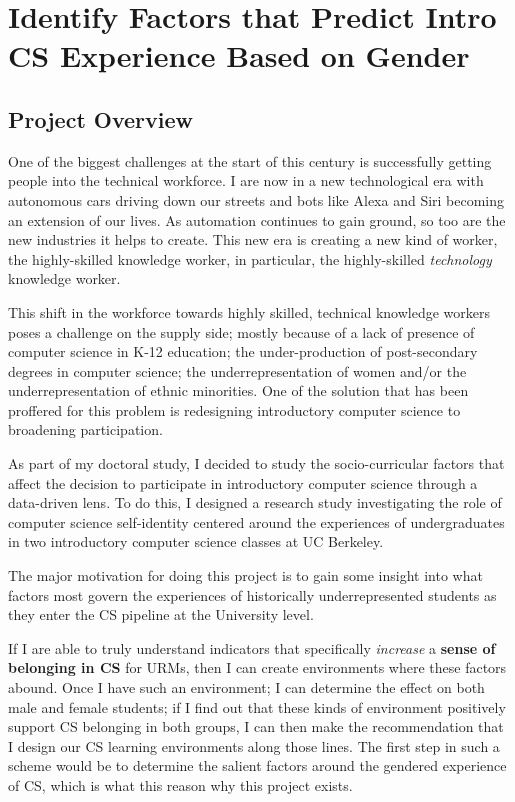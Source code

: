 
\chapter*{Identify Factors that Predict Intro CS Experience Based on Gender}

\section*{Project Overview}

One of the biggest challenges at the start of this century is successfully getting people into the technical workforce. I are now in a new technological era with autonomous cars driving down our streets and bots like Alexa and Siri becoming an extension of our lives. As automation continues to gain ground, so too are the new industries it helps to create. This new era is creating a new kind of worker, the highly-skilled knowledge worker, in particular, the highly-skilled \emph{technology} knowledge worker.

This shift in the workforce towards highly skilled, technical knowledge workers poses a challenge on the supply side; mostly because of a lack of presence of computer science in K-12 education; the under-production of post-secondary degrees in computer science;  the underrepresentation of women and/or the underrepresentation of ethnic minorities. One of the solution that has been proffered for this problem is redesigning introductory computer science to broadening participation.  

As part of my doctoral study, I decided to study the socio-curricular factors that affect the decision to participate in introductory computer science through a data-driven lens. To do this, I designed a research study investigating the role of computer science self-identity centered around the experiences of undergraduates in two introductory computer science classes at UC Berkeley. 

The major motivation for doing this project is to gain some insight into what factors most govern the experiences of historically underrepresented students as they enter the CS pipeline at the University level.

If I are able to truly understand indicators that specifically \emph{increase} a \textbf{sense of belonging in CS} for URMs, then I can create environments where these factors abound. Once I have such an environment; I can determine the effect on both male and female students; if I find out that these kinds of environment positively support CS belonging in both groups, I can then make the recommendation that I design our CS learning environments along those lines. The first step in such a scheme would be to determine the salient factors around the gendered experience of CS, which is what this reason why this project exists.


